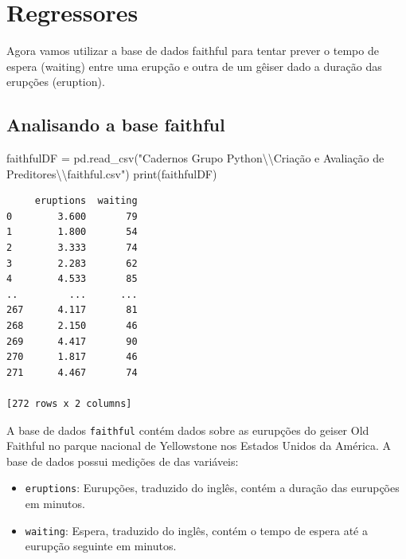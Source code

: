 \documentclass[
  letterpaper,
  DIV=11,
  numbers=noendperiod]{scrreprt}
\newenvironment{Shaded}{\begin{snugshade}}{\end{snugshade}}
\newcommand{\BuiltInTok}[1]{\textcolor[rgb]{0.00,0.23,0.31}{#1}}
\newcommand{\CharTok}[1]{\textcolor[rgb]{0.13,0.47,0.30}{#1}}
\newcommand{\NormalTok}[1]{\textcolor[rgb]{0.00,0.23,0.31}{#1}}
\newcommand{\OperatorTok}[1]{\textcolor[rgb]{0.37,0.37,0.37}{#1}}
\newcommand{\StringTok}[1]{\textcolor[rgb]{0.13,0.47,0.30}{#1}}
\providecommand{\tightlist}{%
  \setlength{\itemsep}{0pt}\setlength{\parskip}{0pt}}\usepackage{longtable,booktabs,array}
\begin{document}

\hypertarget{regressores}{%
\chapter{Regressores}\label{regressores}}

Agora vamos utilizar a base de dados faithful para tentar prever o tempo
de espera (waiting) entre uma erupção e outra de um gêiser dado a
duração das erupções (eruption).

\hypertarget{analisando-a-base-faithful}{%
\section{Analisando a base faithful}\label{analisando-a-base-faithful}}

\begin{Shaded}
\begin{Highlighting}[]
\NormalTok{faithfulDF }\OperatorTok{=}\NormalTok{ pd.read\_csv(}\StringTok{"Cadernos Grupo Python}\CharTok{\textbackslash{}\textbackslash{}}\StringTok{Criação e Avaliação de Preditores}\CharTok{\textbackslash{}\textbackslash{}}\StringTok{faithful.csv"}\NormalTok{)}
\BuiltInTok{print}\NormalTok{(faithfulDF)}
\end{Highlighting}
\end{Shaded}

\begin{verbatim}
     eruptions  waiting
0        3.600       79
1        1.800       54
2        3.333       74
3        2.283       62
4        4.533       85
..         ...      ...
267      4.117       81
268      2.150       46
269      4.417       90
270      1.817       46
271      4.467       74

[272 rows x 2 columns]
\end{verbatim}

A base de dados \texttt{faithful} contém dados sobre as eurupções do
geiser Old Faithful no parque nacional de Yellowstone nos Estados Unidos
da América. A base de dados possui medições de das variáveis:

\begin{itemize}
\tightlist
\item
  \texttt{eruptions}: Eurupções, traduzido do inglês, contém a duração
  das eurupções em minutos.
\item
  \texttt{waiting}: Espera, traduzido do inglês, contém o tempo de
  espera até a eurupção seguinte em minutos.
\end{itemize}
\end{document}
